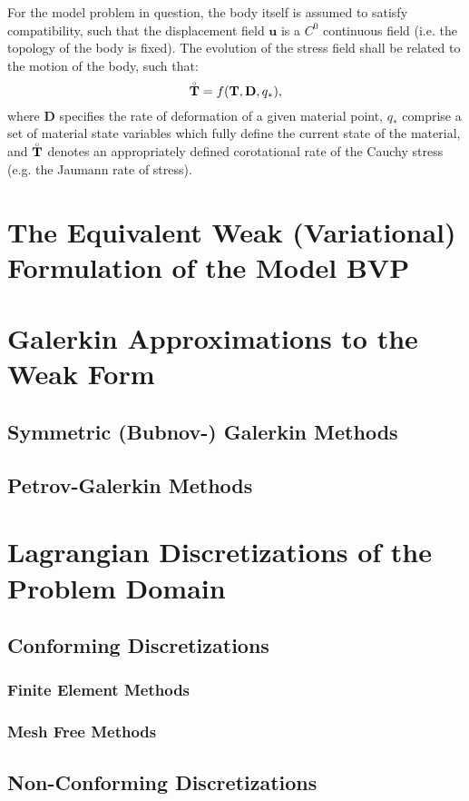 For the model problem in question, the body itself is assumed to satisfy compatibility, such that the displacement field $\mathbf{u}$ is a $C^0$ continuous field (i.e. the topology of the body is fixed). The evolution of the stress field shall be related to the motion of the body, such that:
\begin{equation}
  \accentset{\circ}{\mathbf{T}} = f (\mathbf{T}, \mathbf{D}, q_*),
\end{equation}
where $\mathbf{D}$ specifies the rate of deformation of a given material point, $q_*$ comprise a set of material state variables which fully define the current state of the material, and $\accentset{\circ}{\mathbf{T}}$ denotes an appropriately defined corotational rate of the Cauchy stress (e.g. the Jaumann rate of stress).

\section{The Equivalent Weak (Variational) Formulation of the Model BVP}

\section{Galerkin Approximations to the Weak Form}
\subsection{Symmetric (Bubnov-) Galerkin Methods}
\subsection{Petrov-Galerkin Methods}

\section{Lagrangian Discretizations of the Problem Domain}
\subsection{Conforming Discretizations}
\subsubsection{Finite Element Methods}
\subsubsection{Mesh Free Methods}
\subsection{Non-Conforming Discretizations}

